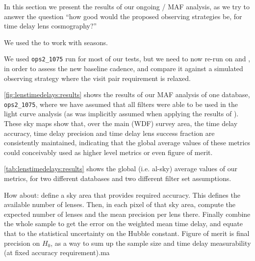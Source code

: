 In this section we present the results of our ongoing \OpSim / MAF
analysis, as we try to
answer the question ``how good would the proposed observing
strategies be, for time delay lens cosmography?''

We used the
 to work
with seasons.

We used \texttt{ops2\_1075} \OpSim run for most of our tests, but we
need to now re-run on  and
, in order to assess the new baseline
cadence, and compare it against a simulated observing strategy where
the visit pair requirement is relaxed.


\autoref{fig:lenstimedelays:results} shows the results of our MAF
analysis of one \OpSim database, \texttt{ops2\_1075}, where we have
assumed that all filters were able to be used in the light curve
analysis (as was implicitly assumed when applying the results of
\citeauthor{LiaoEtal2015}). These sky maps show that, over the main
(WDF) survey area, the time delay accuracy, time delay precision and
time delay lens success fraction are consistently maintained,
indicating that the global average values of these metrics could
conceivably used as higher level metrics or even figure of merit.

\autoref{tab:lenstimedelays:results} shows the global (i.e. al-sky)
average values of our metrics, for two different \OpSim
databases and two different filter set assumptions.




How about: define a sky area that provides required accuracy. This
defines the available number of lenses. Then, in each pixel of that
sky area, compute the expected number of lenses and the mean precision
per lens there. Finally combine the whole sample to get the error on
the weighted mean time delay, and equate that to the statistical
uncertainty on the Hubble constant. Figure of merit is final precision
on $H_0$, as a way to sum up the sample size and time delay
measurability (at fixed accuracy requirement).ma


